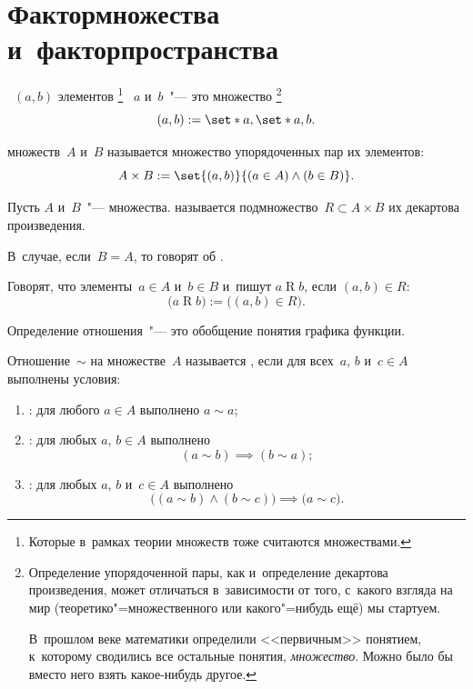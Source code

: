 \section{Фактормножества и~факторпространства}

	\begin{definition}
		\label{def:pair}
		~$(a, b)$ элементов%
		\footnote{Которые в~рамках теории множеств тоже считаются множествами.}%
		~$a$ и~$b$~"--- это множество
		\footnote{%
			Определение упорядоченной пары, как и~определение декартова
			произведения, может отличаться в~зависимости от того, с~какого взгляда
			на мир (теоретико"=множественного или какого"=нибудь ещё) мы стартуем.

			В~прошлом веке математики определили <<первичным>> понятием, к~которому
			сводились все остальные понятия, \emph{множество}. Можно было бы вместо
			него взять какое-нибудь другое.
		}%
		\[
			(a, b) := \set*{a, \set*{a, b}}
			.
		\]
	\end{definition}
	

	\begin{definition}
		\label{def:Decartes_product}
		 множеств~$A$ и~$B$ называется множество
		упорядоченных пар их элементов:
		\[
			A \times B :=
			\set{(a, b)}{(a \in A) \wedge (b \in B)}
			.
		\]
	\end{definition}

	\begin{definition}{}
		\label{def:relation}
		Пусть $A$ и~$B$~"--- множества.  называется подмножество~$R \subset A \times B$ их
		декартова произведения.

		В~случае, если~$B = A$, то говорят об \tdef{отношении на
		множестве~$A$}.

		Говорят, что элементы~$a \in A$ и~$b \in B$  и~пишут $a \mathrel{R} b$, если $(a, b) \in R$:
		\[
			\bigl(
				a \mathrel{R} b
			\bigr)
			:=
			\bigl(
				(a, b) \in R
			\bigr)
			.
		\]
	\end{definition}

	Определение отношения~"--- это обобщение понятия графика функции.

	\begin{definition}
		Отношение~$\sim$ на множестве~$A$ называется , если для всех~$a$, $b$ и~$c \in A$ выполнены условия:
		\begin{enumerate}[1)]
			\item {}: для любого $a \in A$ выполнено
				$a \sim a$;
			\item {}: для любых $a$, $b \in A$ выполнено
				\[
					(a \sim b) \implies (b \sim a);
				\]
			\item {}: для любых $a$, $b$ и~$c \in A$ выполнено
				\[
					\bigl(
						(a \sim b)
						\wedge
						(b \sim c)
					\bigr)
					\implies
					\bigl(
						a \sim c
					\bigr)
					.
				\]
		\end{enumerate}
	\end{definition}

